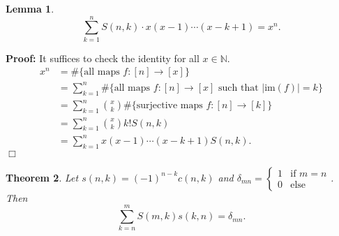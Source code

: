 \documentclass[11pt]{article}
\newtheorem{theorem}{Theorem}
\newtheorem{lemma}[theorem]{Lemma}
\newenvironment{proof}{\noindent \textbf{Proof:}}{$\Box$}
\newcommand{\N}{\mathbb N} %
\begin{document}
\begin{lemma}
\[\sum_{k=1}^nS(n,k)\cdot x(x-1)\cdots(x-k+1) = x^n.\]
\end{lemma}
\begin{proof}
    It suffices to check the identity for all $x\in \N$.
    \begin{align*}
        x^n &= \#\{\text{all maps }f:[n]\to[x]\}\\
        &= \sum_{k=1}^n \#\{\text{all maps }f:[n]\to[x] \text{ such that }|\text{im}(f)|=k\}\\
        &= \sum_{k=1}^n \binom{x}{k}\#\{\text{surjective maps }f:[n]\to[k]\}\\
        &= \sum_{k=1}^n \binom{x}{k}k!S(n,k)\\
        &= \sum_{k=1}^n x(x-1)\cdots(x-k+1)S(n,k).
    \end{align*}
\end{proof}

\begin{theorem}
    Let $s(n,k) = (-1)^{n-k}c(n,k)$ and $\delta_{mn} = \begin{cases}1&\text{if }m=n\\0&\text{else}\end{cases}$. Then
    \[\sum_{k=n}^{m}S(m,k)s(k,n) = \delta_{mn}.\]
\end{theorem}
\end{document}
